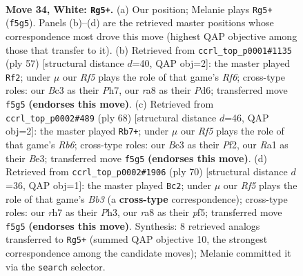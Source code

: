 \documentclass[11pt]{article}
\begin{document}
\clearpage

\begin{figure}[p]\centering
\begin{subfigure}{0.46\textwidth}\centering
\resizebox{\linewidth}{!}{%
\newchessgame
\chessboard[
  setfen={rn4k1/7r/p7/5R2/1P3P2/2B3K1/P3b3/R7 w - - 1 34},
  showmover=false,
  pgfstyle=straightmove, color=movearrow, markmove={f5-g5}
]}
\caption{}
\end{subfigure}\hfill
\begin{subfigure}{0.46\textwidth}\centering
\resizebox{\linewidth}{!}{%
\newchessgame
\chessboard[
  setfen={5b2/3k3p/3p1p2/3N4/1PK5/5r2/7P/7R b - - 1 29},
  showmover=false,
  pgfstyle=straightmove, color=movearrow, markmove={f3-f2}
]}
\caption{}
\end{subfigure}
\\[4pt]
\begin{subfigure}{0.46\textwidth}\centering
\resizebox{\linewidth}{!}{%
\newchessgame
\chessboard[
  setfen={r7/5kp1/1R6/p4b2/P7/2P1B3/5P2/6K1 w - - 0 35},
  showmover=false,
  pgfstyle=straightmove, color=movearrow, markmove={b6-b7}
]}
\caption{}
\end{subfigure}\hfill
\begin{subfigure}{0.46\textwidth}\centering
\resizebox{\linewidth}{!}{%
\newchessgame
\chessboard[
  setfen={1r3b1k/2R4p/1p1r4/5p2/8/1B5P/PP2RP2/6K1 w - - 0 36},
  showmover=false,
  pgfstyle=straightmove, color=movearrow, markmove={b3-c2}
]}
\caption{}
\end{subfigure}
\caption{\textbf{Move 34, White: \texttt{Rg5+}.} (a) Our position; Melanie plays \texttt{Rg5+} (\texttt{f5g5}). Panels (b)--(d) are the retrieved master positions whose correspondence most drove this move (highest QAP objective among those that transfer to it). (b) Retrieved from \texttt{ccrl\_top\_p0001\#1135} (ply 57) [structural distance $d$=40, QAP obj=2]: the master played \texttt{Rf2}; under $\mu$ our \emph{Rf5} plays the role of that game's \emph{Rf6}; cross-type roles: our \emph{B}c3 as their \emph{P}h7, our \emph{r}a8 as their \emph{P}d6; transferred move \texttt{f5g5} \textbf{(endorses this move)}. (c) Retrieved from \texttt{ccrl\_top\_p0002\#489} (ply 68) [structural distance $d$=46, QAP obj=2]: the master played \texttt{Rb7+}; under $\mu$ our \emph{Rf5} plays the role of that game's \emph{Rb6}; cross-type roles: our \emph{B}c3 as their \emph{P}f2, our \emph{R}a1 as their \emph{B}e3; transferred move \texttt{f5g5} \textbf{(endorses this move)}. (d) Retrieved from \texttt{ccrl\_top\_p0002\#1906} (ply 70) [structural distance $d$=36, QAP obj=1]: the master played \texttt{Bc2}; under $\mu$ our \emph{Rf5} plays the role of that game's \emph{Bb3} (a \textbf{cross-type} correspondence); cross-type roles: our \emph{r}h7 as their \emph{P}h3, our \emph{r}a8 as their \emph{p}f5; transferred move \texttt{f5g5} \textbf{(endorses this move)}. Synthesis: 8 retrieved analogs transferred to \texttt{Rg5+} (summed QAP objective 10, the strongest correspondence among the candidate moves); Melanie committed it via the \texttt{search} selector.}
\label{fig:thought-m66}
\end{figure}
\end{document}
